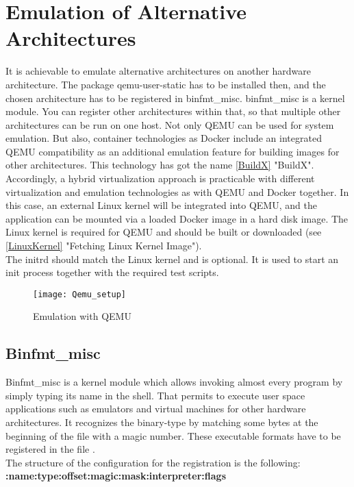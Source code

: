 \section{Emulation of Alternative Architectures}\label{AlternativeArchitectures}

It is achievable to emulate alternative architectures on another hardware architecture. The package qemu-user-static has to be installed then, and the chosen architecture has to be registered in binfmt\_misc. binfmt\_misc is a kernel module. 
You can register other architectures within that, so that multiple other architectures can be run on one host. 
Not only \gls{QEMU} can be used for system emulation. But also, container technologies as Docker include an integrated \gls{QEMU} compatibility as an additional emulation feature for building images for other architectures. 
This technology has got the name \ref{BuildX} "BuildX". Accordingly, a hybrid virtualization approach is practicable with different virtualization and emulation technologies as with \gls{QEMU} and Docker together. In this case, an external Linux kernel will be integrated into \gls{QEMU}, and the application can be mounted via a loaded Docker image in a hard disk image. 
The Linux kernel is required for \gls{QEMU} and should be built or downloaded (see \ref{LinuxKernel} "Fetching Linux Kernel Image").\\
The initrd should match the Linux kernel and is optional. It is used to start an init process together with the required test scripts. \\

\begin{figure}[H]
\centering
\texttt{[image: Qemu\_setup]}
 \caption{Emulation with QEMU}
    \label{QEMU_Emulation}
\end{figure}


\newpage
\subsection{Binfmt\_misc} \label{Binfmt}

Binfmt\_misc is a kernel module which allows invoking almost every program by simply typing its name in the shell. That permits to execute user space applications such as emulators and virtual machines for other hardware architectures. It recognizes the binary-type by matching some bytes at the beginning of the file with a magic number. These executable formats have to be registered in the file .\\
The structure of the configuration for the registration is the following: \\ \textbf{:name:type:offset:magic:mask:interpreter:flags} 

